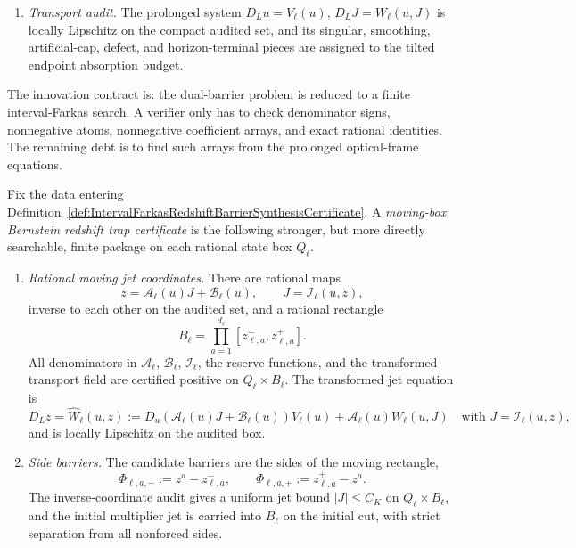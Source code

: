 \begin{definition}
\begin{enumerate}
    \item \emph{Transport audit.}  The prolonged system
    $D_Lu=V_\ell(u)$, $D_LJ=W_\ell(u,J)$ is locally Lipschitz on the compact
    audited set, and its singular, smoothing, artificial-cap, defect, and
    horizon-terminal pieces are assigned to the tilted endpoint absorption
    budget.
\end{enumerate}
The innovation contract is: the dual-barrier problem is reduced to a finite
interval-Farkas search.  A verifier only has to check denominator signs,
nonnegative atoms, nonnegative coefficient arrays, and exact rational
identities.  The remaining debt is to find such arrays from the prolonged
optical-frame equations.
\end{definition}

\begin{definition}\label{def:MovingBoxBernsteinRedshiftTrapCertificate}
Fix the data entering
Definition~\ref{def:IntervalFarkasRedshiftBarrierSynthesisCertificate}.  A
\emph{moving-box Bernstein redshift trap certificate} is the following
stronger, but more directly searchable, finite package on each rational state
box $Q_\ell$.
\begin{enumerate}
    \item \emph{Rational moving jet coordinates.}  There are rational maps
    \[
        z=\mathcal A_\ell(u)J+\mathcal B_\ell(u),
        \qquad
        J=\mathcal I_\ell(u,z),
    \]
    inverse to each other on the audited set, and a rational rectangle
    \[
        B_\ell=\prod_{a=1}^{d_\ell}[z_{\ell,a}^-,z_{\ell,a}^+].
    \]
    All denominators in $\mathcal A_\ell$, $\mathcal B_\ell$,
    $\mathcal I_\ell$, the reserve functions, and the transformed transport
    field are certified positive on $Q_\ell\times B_\ell$.  The transformed
    jet equation is
    \[
        D_Lz=\widehat W_\ell(u,z)
        :=
        D_u(\mathcal A_\ell(u)J+\mathcal B_\ell(u))V_\ell(u)
        +\mathcal A_\ell(u)W_\ell(u,J)
        \quad\text{with }J=\mathcal I_\ell(u,z),
    \]
    and is locally Lipschitz on the audited box.

    \item \emph{Side barriers.}  The candidate barriers are the sides of the
    moving rectangle,
    \[
        \Phi_{\ell,a,-}:=z^a-z_{\ell,a}^-,
        \qquad
        \Phi_{\ell,a,+}:=z_{\ell,a}^+-z^a .
    \]
    The inverse-coordinate audit gives a uniform jet bound
    $|J|\le C_K$ on $Q_\ell\times B_\ell$, and the initial multiplier jet is
    carried into $B_\ell$ on the initial cut, with strict separation from all
    nonforced sides.


\end{enumerate}
\end{definition}
